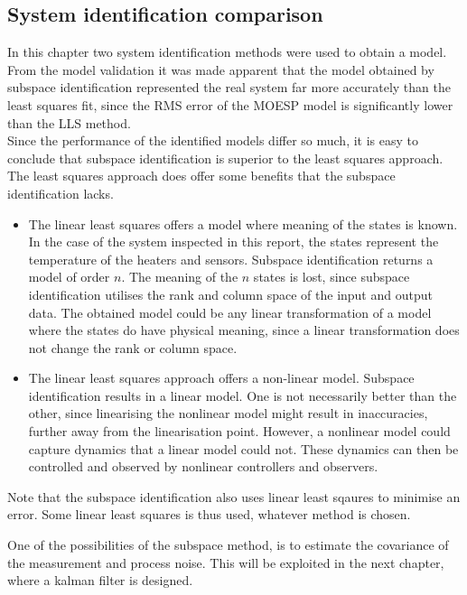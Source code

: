 \subsection{System identification comparison}
In this chapter two system identification methods were used to obtain a model. From the model validation it was made apparent that the model obtained by subspace identification represented the real system far more accurately than the least squares fit, since the RMS error of the MOESP model is significantly lower than the LLS method.\\
Since the performance of the identified models differ so much, it is easy to conclude that subspace identification is superior to the least squares approach. The least squares approach does offer some benefits that the subspace identification lacks.
\begin{itemize}
    \item The linear least squares offers a model where meaning of the states is known. In the case of the system inspected in this report, the states represent the temperature of the heaters and sensors. Subspace identification returns a model of order $n$. The meaning of the $n$ states is lost, since subspace identification utilises the rank and column space of the input and output data. The obtained model could be any linear transformation of a model where the states do have physical meaning, since a linear transformation does not change the rank or column space.
    \item The linear least squares approach offers a non-linear model. Subspace identification results in a linear model. One is not necessarily better than the other, since linearising the nonlinear model might result in inaccuracies, further away from the linearisation point. However, a nonlinear model could capture dynamics that a linear model could not. These dynamics can then be controlled and observed by nonlinear controllers and observers.
\end{itemize}
Note that the subspace identification also uses linear least sqaures to minimise an error. Some linear least squares is thus used, whatever method is chosen.

One of the possibilities of the subspace method, is to estimate the covariance of the measurement and process noise. This will be exploited in the next chapter, where a kalman filter is designed.